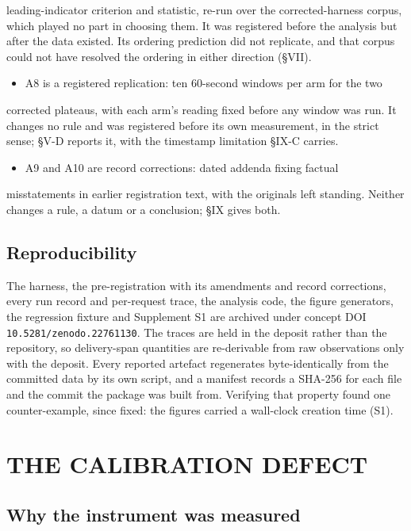 \documentclass{ieeeaccess}
\begin{document}
leading-indicator criterion and statistic, re-run over the corrected-harness corpus, which played no part in choosing them. It was registered before the analysis but after the data existed. Its ordering prediction did not replicate, and that corpus could not have resolved the ordering in either direction (\S{}VII).

\begin{itemize}
\item A8 is a registered replication: ten 60-second windows per arm for the two
\end{itemize}

corrected plateaus, with each arm's reading fixed before any window was run. It changes no rule and was registered before its own measurement, in the strict sense; \S{}V-D reports it, with the timestamp limitation \S{}IX-C carries.

\begin{itemize}
\item A9 and A10 are record corrections: dated addenda fixing factual
\end{itemize}

misstatements in earlier registration text, with the originals left standing. Neither changes a rule, a datum or a conclusion; \S{}IX gives both.

\subsection{Reproducibility}

The harness, the pre-registration with its amendments and record corrections, every run record and per-request trace, the analysis code, the figure generators, the regression fixture and Supplement S1 are archived under concept DOI \texttt{10.5281/zenodo.22761130}. The traces are held in the deposit rather than the repository, so delivery-span quantities are re-derivable from raw observations only with the deposit. Every reported artefact regenerates byte-identically from the committed data by its own script, and a manifest records a SHA-256 for each file and the commit the package was built from. Verifying that property found one counter-example, since fixed: the figures carried a wall-clock creation time (S1).

\section{THE CALIBRATION DEFECT}

\subsection{Why the instrument was measured}
\end{document}
